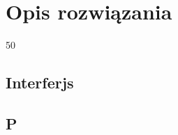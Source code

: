 \chapter{Opis rozwiązania}
\label{cha:Opis rozwiązania}

50%

\section{Interferjs}
\label{sec:Interferjs}

\section{P}
\label{sec:P}

